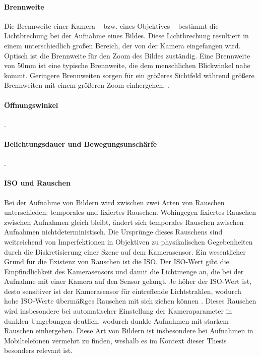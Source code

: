 \paragraph{Brennweite}

Die Brennweite einer Kamera -- bzw. eines Objektives -- bestimmt die Lichtbrechung bei der Aufnahme eines Bildes. Diese Lichtbrechung resultiert in einem unterschiedlich großen Bereich, der von der Kamera eingefangen wird. Optisch ist die Brennweite für den Zoom des Bildes zuständig. Eine Brennweite von 50mm ist eine typische Brennweite, die dem menschlichen Blickwinkel nahe kommt. Geringere Brennweiten sorgen für ein größeres Sichtfeld während größere Brennweiten mit einem größeren Zoom einhergehen. \cite{focal_lentgh}.

\paragraph{Öffnungswinkel}

.

\paragraph{Belichtungsdauer und Bewegungsunschärfe}

.

\paragraph{ISO und Rauschen}

Bei der Aufnahme von Bildern wird zwischen zwei Arten von Rauschen unterschieden: temporales und fixiertes Rauschen. Wohingegen fixiertes Rauschen zwischen Aufnahmen gleich bleibt, ändert sich temporales Rauschen zwischen Aufnahmen nichtdeterministisch. Die Ursprünge dieses Rauschens sind weitreichend von Imperfektionen in Objektiven zu physikalischen Gegebenheiten durch die Diskretisierung einer Szene auf dem Kamerasensor. Ein wesentlicher Grund für die Existenz von Rauschen ist die ISO. Der ISO-Wert gibt die Empfindlichkeit des Kamerasensors und damit die Lichtmenge an, die bei der Aufnahme mit einer Kamera auf den Sensor gelangt. Je höher der ISO-Wert ist, desto sensitiver ist der Kamerasensor für eintreffende Lichtstrahlen, wodurch hohe ISO-Werte übermäßiges Rauschen mit sich ziehen können \cite{camera_everything}. Dieses Rauschen wird insbesondere bei automatischer Einstellung der Kameraparameter in dunklen Umgebungen deutlich, wodurch dunkle Aufnahmen mit starkem Rauschen einhergehen. Diese Art von Bildern ist insbesondere bei Aufnahmen in Mobiltelefonen vermehrt zu finden, weshalb es im Kontext dieser Thesis besonders relevant ist.

